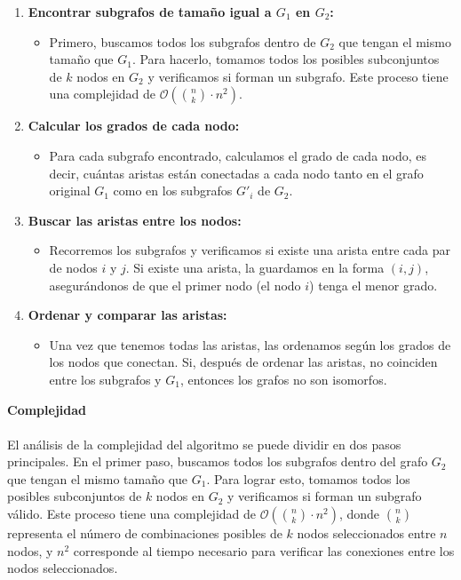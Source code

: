\documentclass[12pt,a4paper]{article}
\begin{document}
\begin{enumerate}
    \item \textbf{Encontrar subgrafos de tamaño igual a $G_1$ en $G_2$:}
    \begin{itemize}
        \item Primero, buscamos todos los subgrafos dentro de $G_2$ que tengan el mismo tamaño que $G_1$. Para hacerlo, tomamos todos los posibles subconjuntos de $k$ nodos en $G_2$ y verificamos si forman un subgrafo. Este proceso tiene una complejidad de $\mathcal{O}\left(\binom{n}{k} \cdot n^2\right)$.
    \end{itemize}
    
    \item \textbf{Calcular los grados de cada nodo:}
    \begin{itemize}
        \item Para cada subgrafo encontrado, calculamos el grado de cada nodo, es decir, cuántas aristas están conectadas a cada nodo tanto en el grafo original $G_1$ como en los subgrafos $G'_i$ de $G_2$.
    \end{itemize}
    
    \item \textbf{Buscar las aristas entre los nodos:}
    \begin{itemize}
        \item Recorremos los subgrafos y verificamos si existe una arista entre cada par de nodos $i$ y $j$. Si existe una arista, la guardamos en la forma $(i,j)$, asegurándonos de que el primer nodo (el nodo $i$) tenga el menor grado.
    \end{itemize}
    
    \item \textbf{Ordenar y comparar las aristas:}
    \begin{itemize}
        \item Una vez que tenemos todas las aristas, las ordenamos según los grados de los nodos que conectan. Si, después de ordenar las aristas, no coinciden entre los subgrafos y $G_1$, entonces los grafos no son isomorfos.
    \end{itemize}
\end{enumerate}
\textbf{Complejidad}\\
\\
El análisis de la complejidad del algoritmo se puede dividir en dos pasos principales. En el primer paso, buscamos todos los subgrafos dentro del grafo \( G_2 \) que tengan el mismo tamaño que \( G_1 \). Para lograr esto, tomamos todos los posibles subconjuntos de \( k \) nodos en \( G_2 \) y verificamos si forman un subgrafo válido. Este proceso tiene una complejidad de \( \mathcal{O}\left(\binom{n}{k} \cdot n^2\right) \), donde \( \binom{n}{k} \) representa el número de combinaciones posibles de \( k \) nodos seleccionados entre \( n \) nodos, y \( n^2 \) corresponde al tiempo necesario para verificar las conexiones entre los nodos seleccionados.
\end{document}
